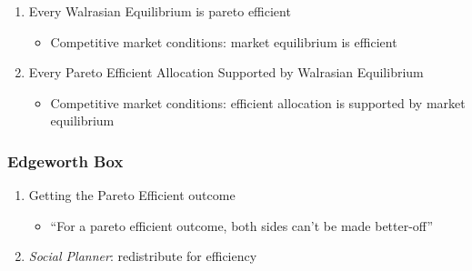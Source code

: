\documentclass[11pt, english]{article}
\begin{document}
	\begin{enumerate}
	\setlength\itemsep{0cm}
		\item Every Walrasian Equilibrium is pareto efficient
		\begin{itemize}
			\item Competitive market conditions: market equilibrium is efficient 
		\end{itemize}
		\item Every Pareto Efficient Allocation Supported by Walrasian Equilibrium
		\begin{itemize}
			\item Competitive market conditions: efficient allocation is supported by market equilibrium
		\end{itemize}
	\end{enumerate}

		\subsubsection{Edgeworth Box}

	\begin{enumerate}                               
        \setlength\itemsep{0cm}
		\item Getting the Pareto Efficient outcome
		\begin{itemize}
			\item ``For a pareto efficient outcome, both sides can't be made better-off''
		\end{itemize}
		\item \textit{Social Planner}: redistribute for efficiency 
	\end{enumerate}
\end{document}
